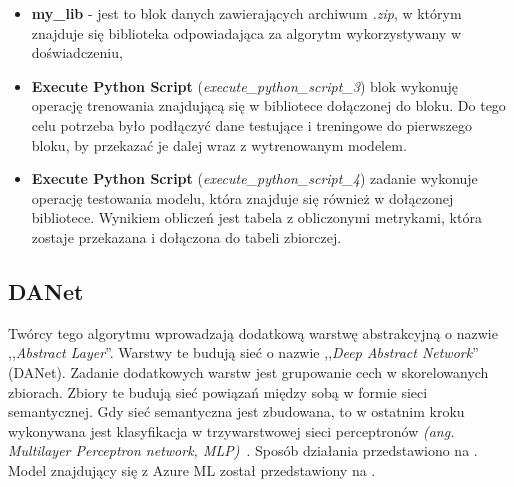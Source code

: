 \begin{itemize}
    \item \textbf{my\_lib} - jest to blok danych zawierających archiwum \textit{.zip}, w którym znajduje się biblioteka odpowiadająca za algorytm wykorzystywany w doświadczeniu,
    \item \textbf{Execute Python Script} (\textit{execute\_python\_script\_3}) blok wykonuję operację trenowania znajdującą się w bibliotece dołączonej do bloku. Do tego celu potrzeba było podłączyć dane testujące i treningowe do pierwszego bloku, by przekazać je dalej wraz z wytrenowanym modelem.
    \item \textbf{Execute Python Script} (\textit{execute\_python\_script\_4}) zadanie wykonuje operację testowania modelu, która znajduje się również w dołączonej bibliotece. Wynikiem obliczeń jest tabela z obliczonymi metrykami, która zostaje przekazana i dołączona do tabeli zbiorczej.
\end{itemize}

\subsection{DANet}
Twórcy tego algorytmu wprowadzają dodatkową warstwę abstrakcyjną o nazwie ,,\textit{Abstract Layer}''. Warstwy te budują sieć o nazwie ,,\textit{Deep Abstract Network}'' (DANet). Zadanie dodatkowych warstw jest grupowanie cech w skorelowanych zbiorach. Zbiory te budują sieć powiązań między sobą w formie sieci semantycznej. Gdy sieć semantyczna jest zbudowana, to w ostatnim kroku wykonywana jest klasyfikacja w trzywarstwowej sieci perceptronów \textit{(ang. Multilayer Perceptron network, MLP)}~\cite{Chen2022, Danet}. Sposób działania przedstawiono na . Model znajdujący się z Azure ML został przedstawiony na .

